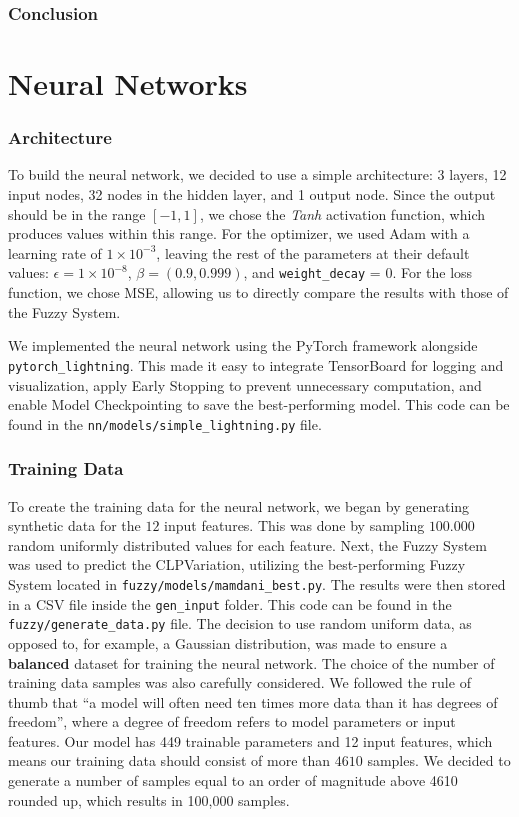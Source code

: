 \documentclass[11pt]{report}
\begin{document}
\section{Conclusion}


\part{Neural Networks}

\section{Architecture}

To build the neural network, we decided to use a simple architecture: 3 layers, 12 input nodes, 32 nodes in the hidden layer, and 1 output node.
Since the output should be in the range \([-1, 1]\), we chose the \emph{Tanh} activation function, which produces values within this range.
For the optimizer, we used Adam with a learning rate of $1 \times 10^{-3}$, leaving the rest of the parameters at their default values: $\epsilon = 1 \times 10^{-8}$, $\beta = (0.9, 0.999)$, and \texttt{weight\_decay} = 0.
For the loss function, we chose MSE, allowing us to directly compare the results with those of the Fuzzy System.

We implemented the neural network using the PyTorch framework alongside \newline \texttt{pytorch\_lightning}.
This made it easy to integrate TensorBoard for logging and visualization, apply Early Stopping to prevent unnecessary computation, and enable Model Checkpointing to save the best-performing model.
This code can be found in the \texttt{nn/models/simple\_lightning.py} file.

\section{Training Data}

To create the training data for the neural network, we began by generating synthetic data for the $12$ input features.
This was done by sampling $100.000$ random uniformly distributed values for each feature.
Next, the Fuzzy System was used to predict the CLPVariation, utilizing the best-performing Fuzzy System located in \texttt{fuzzy/models/mamdani\_best.py}.
The results were then stored in a CSV file inside the \texttt{gen\_input} folder.
This code can be found in the \texttt{fuzzy/generate\_data.py} file.
The decision to use random uniform data, as opposed to, for example, a Gaussian distribution, was made to ensure a \textbf{balanced} dataset for training the neural network.
The choice of the number of training data samples was also carefully considered.
We followed the rule of thumb that ``a model will often need ten times more data than it has degrees of freedom'', where a degree of freedom refers to model parameters or input features.
Our model has 449 trainable parameters and 12 input features, which means our training data should consist of more than $4610$ samples.
We decided to generate a number of samples equal to an order of magnitude above 4610 rounded up, which results in 100,000 samples.
\end{document}
